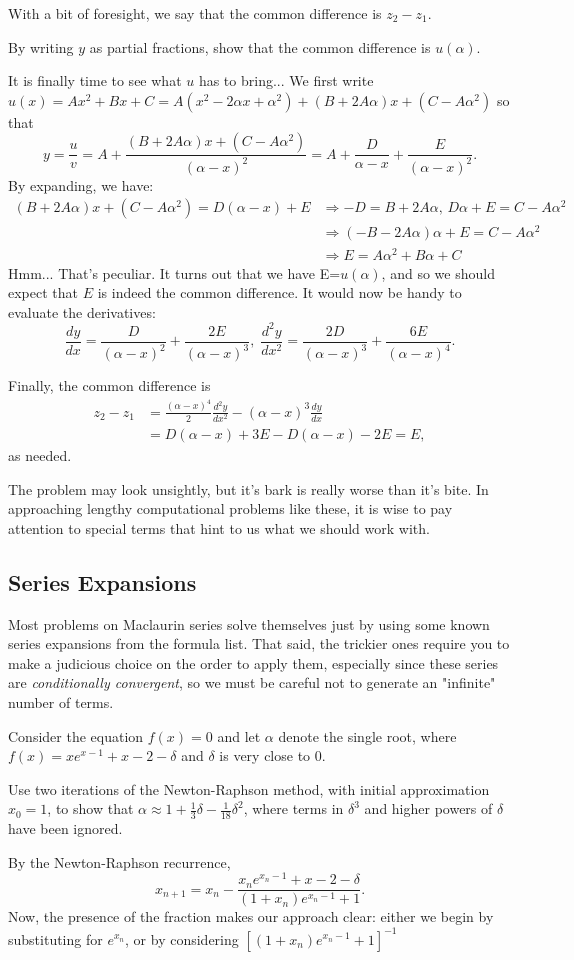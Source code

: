 \documentclass[../jarvis.tex]{subfiles}
\begin{document}
With a bit of foresight, we say that the common difference is $z_2-z_1.$
\begin{example}[cont.]
By writing $y$ as partial fractions, show that the common difference is $u(\alpha)$.
\end{example}
It is finally time to see what $u$ has to bring... We first write $u(x)=Ax^2+Bx+C = A(x^2-2\alpha x+\alpha^2)+(B+2A\alpha)x+(C-A\alpha^2)$ so that
$$y=\frac{u}{v}=A+\frac{(B+2A\alpha)x+(C-A\alpha^2)}{(\alpha-x)^2}=A+\frac{D}{\alpha-x}+\frac{E}{(\alpha-x)^2}.$$
By expanding, we have:
\begin{align*}
    (B+2A\alpha)x+(C-A\alpha^2)=D(\alpha-x)+E &\Longrightarrow -D=B+2A\alpha, \, D\alpha+E=C-A\alpha^2 \\
    &\Longrightarrow (-B-2A\alpha)\alpha+E=C-A\alpha^2 \\
    &\Longrightarrow E=A\alpha^2+B\alpha+C
\end{align*}
Hmm... That's peculiar. It turns out that we have E=$u(\alpha)$, and so we should expect that $E$ is indeed the common difference.
It would now be handy to evaluate the derivatives: $$\frac{dy}{dx}=\frac{D}{(\alpha-x)^2}+\frac{2E}{(\alpha-x)^3},\; \frac{d^2y}{dx^2}=\frac{2D}{(\alpha-x)^3}+\frac{6E}{(\alpha-x)^4}.$$

Finally, the common difference is
\begin{align*}
    z_2-z_1&=\frac{(\alpha-x)^4}{2}\frac{d^2y}{dx^2}-(\alpha-x)^3\frac{dy}{dx} \\
    &=D(\alpha-x)+3E-D(\alpha-x)-2E=E,
\end{align*}
as needed.
\begin{moral}
The problem may look unsightly, but it's bark is really worse than it's bite. In approaching lengthy computational problems like these, it is wise to pay attention to special terms that hint to us what we should work with.
\end{moral}
\subsection{Series Expansions}
Most problems on Maclaurin series solve themselves just by using some known series expansions from the formula list. That said, the trickier ones require you to make a judicious choice on the order to apply them, especially since these series are \textit{conditionally convergent}, so we must be careful not to generate an "infinite" number of terms.
\begin{example} 
Consider the equation $f(x)=0$ and let $\alpha$ denote the single root, where $f(x)=xe^{x-1}+x-2-\delta$ and $\delta$ is very close to $0$.

Use two iterations of the Newton-Raphson method, with initial approximation $x_0=1$, to show that $\alpha \approx 1+\frac{1}{3}\delta-\frac{1}{18}\delta^2$, where terms in $\delta^3$ and higher powers of $\delta$ have been ignored.
\end{example}
By the Newton-Raphson recurrence, $$x_{n+1}=x_n-\frac{x_ne^{x_n-1}+x-2-\delta}{(1+x_n)e^{x_n-1}+1}.$$
Now, the presence of the fraction makes our approach clear: either we begin by substituting for $e^{x_n}$, or by considering $\left[(1+x_n)e^{x_n-1}+1\right]^{-1}$
\end{document}
